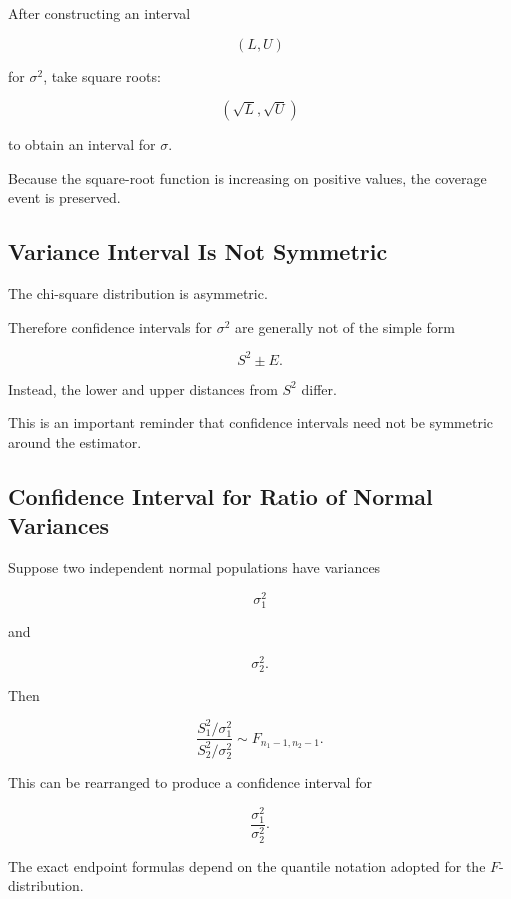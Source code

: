 After constructing an interval

\[
(L,U)
\]

for \(\sigma^2\), take square roots:

\[
\boxed{
(\sqrt{L},\sqrt{U})
}
\]

to obtain an interval for \(\sigma\).

Because the square-root function is increasing on positive values, the
coverage event is preserved.

\subsection{Variance Interval Is Not Symmetric}
\label{subsec:variance-ci-asymmetry}

The chi-square distribution is asymmetric.

Therefore confidence intervals for \(\sigma^2\) are generally not of the
simple form

\[
S^2\pm E.
\]

Instead, the lower and upper distances from \(S^2\) differ.

This is an important reminder that confidence intervals need not be
symmetric around the estimator.

\subsection{Confidence Interval for Ratio of Normal Variances}
\label{subsec:ci-ratio-variances}

Suppose two independent normal populations have variances

\[
\sigma_1^2
\]

and

\[
\sigma_2^2.
\]

Then

\[
\boxed{
\frac{
S_1^2/\sigma_1^2
}{
S_2^2/\sigma_2^2
}
\sim
F_{n_1-1,n_2-1}.
}
\]

This can be rearranged to produce a confidence interval for

\[
\boxed{
\frac{
\sigma_1^2
}{
\sigma_2^2
}.
}
\]

The exact endpoint formulas depend on the quantile notation adopted for
the \(F\)-distribution.


